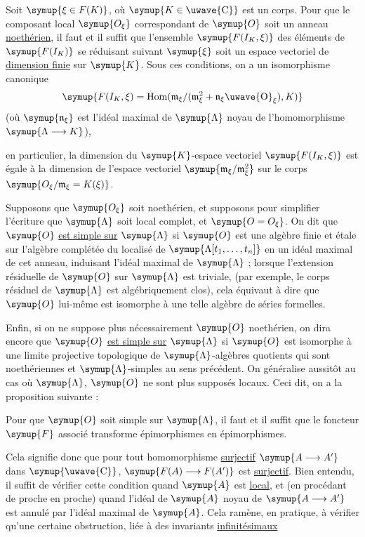  Soit $\symup{\xi\in F(K)}$, où $\symup{K\in\text{\uwave{C}}}$ est un
corps. Pour que le composant local $\symup{O_\xi}$ correspondant de $\symup{O}$ soit un anneau \uline{noethérien}, il faut et il suffit que l'ensemble $\symup{F(I_K,\xi)}$ des éléments de
$\symup{F(I_K)}$ se réduisant suivant $\symup{\xi}$ soit un espace vectoriel de \uline{dimension finie} sur $\symup{K}$. Sous ces conditions, on a un isomorphisme canonique
\[
  \symup{F(I_K,\xi)=\operatorname{Hom}(\mathfrak m_\xi/(\mathfrak m_\xi^2+\mathfrak n_\xi\text{\uwave{O}}_\xi),K)}
\]
(où $\symup{\mathfrak n_\xi}$ est l'idéal maximal de $\symup{\Lambda}$ noyau de l'homomorphisme $\symup{\Lambda\longrightarrow K}$),

en particulier, la dimension du $\symup{K}$-espace vectoriel $\symup{F(I_K,\xi)}$ est égale à
la dimension de l'espace vectoriel $\symup{\mathfrak m_\xi/\mathfrak m_\xi^2}$ sur le corps
$\symup{O_\xi/\mathfrak m_\xi=K(\xi)}$.

Supposons que $\symup{O_\xi}$ soit noethérien, et supposons pour simplifier l'écriture
que $\symup{\Lambda}$ soit local complet, et $\symup{O=O_\xi}$. On dit que $\symup{O}$ \uline{est simple sur} $\symup{\Lambda}$ si $\symup{O}$ est une algèbre finie et étale sur
l'algèbre complétée du localisé de $\symup{\Lambda[t_1,\ldots,t_n]}$ en un idéal
maximal de cet anneau, induisant l'idéal maximal de $\symup{\Lambda}$ ; lorsque
l'extension résiduelle de $\symup{O}$ sur $\symup{\Lambda}$ est triviale, (par exemple, le
corps résiduel de $\symup{\Lambda}$ est algébriquement clos), cela équivaut à dire que
$\symup{O}$ lui-même est isomorphe à une telle algèbre de séries formelles.

Enfin, si on ne suppose plus nécessairement $\symup{O}$ noethérien, on dira encore que
$\symup{O}$ \uline{est simple sur} $\symup{\Lambda}$ si $\symup{O}$ est isomorphe à une limite projective
topologique de $\symup{\Lambda}$-algèbres quotients qui sont noethériennes et
$\symup{\Lambda}$-simples au sens précédent. On généralise aussitôt au cas où
$\symup{\Lambda}$, $\symup{O}$ ne sont plus supposés locaux. Ceci dit, on a la proposition
suivante :

 Pour que $\symup{O}$ soit simple sur $\symup{\Lambda}$, il faut et il
suffit que le foncteur $\symup{F}$ associé transforme épimorphismes en épimorphismes.

Cela signifie donc que pour tout homomorphisme \uline{surjectif}
$\symup{A\longrightarrow A'}$ dans $\symup{\text{\uwave{C}}}$,
$\symup{F(A)\longrightarrow F(A')}$ est \uline{surjectif}. Bien entendu, il suffit de vérifier
cette condition quand $\symup{A}$ est \uline{local}, et (en procédant de proche en proche)
quand l'idéal de $\symup{A}$ noyau de $\symup{A\longrightarrow A'}$ est annulé par l'idéal
maximal de $\symup{A}$. Cela ramène, en pratique, à vérifier qu'une certaine
obstruction, liée à des invariants \uline{infinitésimaux}

